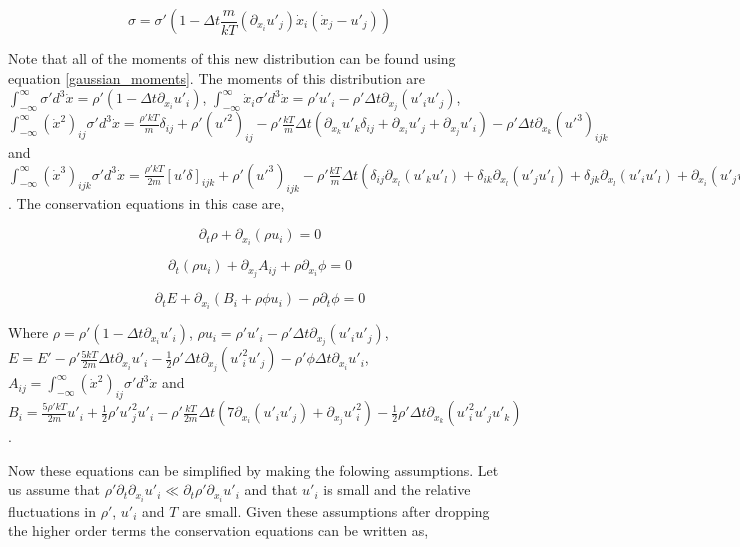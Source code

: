\documentclass[%
 twocolumn,
 preprint, onecolumn,
 amsmath,amssymb,
 aps,
]{revtex4-1}
\newcommand{\intVdot}[1]{\int_{-\infty}^{\infty} #1 d^3\dot{x}}
\begin{document}
\begin{equation}
\sigma = \sigma'\left(1-\Delta t\frac{m}{kT}\left(\partial_{x_i}u'_j\right)\dot{x}_i\left(\dot{x}_j-u'_j\right)\right)
\label{perturbed_gaussian_distribution}
\end{equation}

Note that all of the moments of this new distribution can be found using equation \eqref{gaussian_moments}. The moments of this distribution are $\intVdot{\sigma'}=\rho'\left(1-\Delta t\partial_{x_i}u'_i\right)$, $\intVdot{\dot{x}_i\sigma'}=\rho' u'_i-\rho'\Delta t\partial_{x_j}\left(u'_iu'_j\right)$, $\intVdot{\left(\dot{x}^2\right)_{ij}\sigma'}=\frac{\rho'kT}{m}\delta_{ij} + \rho'\left({u'}^2\right)_{ij}-\rho'\frac{kT}{m}\Delta t\left(\partial_{x_k}u'_k\delta_{ij} + \partial_{x_i}u'_j + \partial_{x_j}u'_i\right)-\rho'\Delta t\partial_{x_k}\left({u'}^3\right)_{ijk}$ and $\intVdot{\left(\dot{x}^3\right)_{ijk}\sigma'}=\frac{\rho'kT}{2m}\left[u'\delta\right]_{ijk} + \rho'\left(u'^3\right)_{ijk}-\rho'\frac{kT}{m}\Delta t\left(\delta_{ij}\partial_{x_l}\left(u'_ku'_l\right)+\delta_{ik}\partial_{x_l}\left(u'_ju'_l\right) + \delta_{jk}\partial_{x_l}\left(u'_iu'_l\right) + \partial_{x_i}\left(u'_ju'_k\right) + \partial_{x_j}\left(u'_iu'_k\right) + \partial_{x_k}\left(u'_iu'_j\right)\right)-\rho'\Delta t\partial_{x_l}\left({u'}^4\right)_{ijkl}$. The conservation equations in this case are,

\[
\partial_t \rho + \partial_{x_i}\left(\rho u_i\right)=0
\]

\[
\partial_t \left(\rho u_i\right) + \partial_{x_j}A_{ij} + \rho\partial_{x_i}\phi = 0
\]

\[
\partial_t E + \partial_{x_i}\left(B_i + \rho\phi u_i\right)-\rho\partial_t\phi = 0
\]

Where $\rho=\rho'\left(1-\Delta t\partial_{x_i}u'_i\right)$, $\rho u_i=\rho' u'_i-\rho'\Delta t\partial_{x_j}\left(u'_iu'_j\right)$, $E=E'-\rho'\frac{5kT}{2m}\Delta t\partial_{x_i}u'_i-\frac{1}{2}\rho'\Delta t\partial_{x_j}\left({u'}_i^2u'_j\right)-\rho'\phi\Delta t\partial_{x_i}u'_i$, $A_{ij}=\intVdot{\left(\dot{x}^2\right)_{ij}\sigma'}$ and $B_i=\frac{5\rho'kT}{2m}u'_i + \frac{1}{2}\rho'{u'}_j^2u'_i-\rho'\frac{kT}{2m}\Delta t\left(7\partial_{x_i}\left(u'_iu'_j\right) + \partial_{x_j}{u'}_i^2\right)-\frac{1}{2}\rho'\Delta t\partial_{x_k}\left({u'}_i^2u'_ju'_k\right)$.

Now these equations can be simplified by making the folowing assumptions. Let us assume that $\rho'\partial_t\partial_{x_i}u'_i \ll \partial_t\rho'\partial_{x_i}u'_i$ and that $u'_i$ is small and the relative fluctuations in $\rho'$, $u'_i$ and $T$ are small. Given these assumptions after dropping the higher order terms the conservation equations can be written as,
\end{document}
